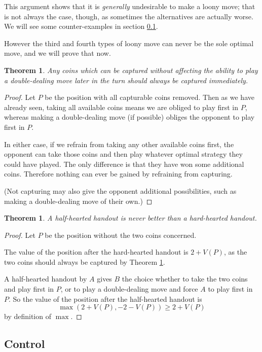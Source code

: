 \documentclass[a4paper,twocolumn]{article}
\newtheorem{freecoins}[thm]{Theorem}
\newtheorem{halfheartedbad}[thm]{Theorem}
\begin{document}
This argument shows that it is \emph{generally} undesirable to make a
loony move; that is not always the case, though, as sometimes the
alternatives are actually worse. We will see some counter-examples in
section \ref{smallchains}.

However the third and fourth types of loony move can never be the sole
optimal move, and we will prove that now.

\begin{freecoins}\label{freecoins}
  Any coins which can be captured without affecting the ability to
  play a double-dealing move later in the turn should always be
  captured immediately.
\end{freecoins}
\begin{proof}
  Let $P$ be the position with all capturable coins removed. Then
  as we have already seen, taking all available coins means we are
  obliged to play first in $P$, whereas making a double-dealing move
  (if possible) obliges the opponent to play first in $P$.

  In either case, if we refrain from taking any other available coins
  first, the opponent can take those coins and then play whatever
  optimal strategy they could have played. The only difference is that
  they have won some additional coins. Therefore nothing can ever be
  gained by refraining from capturing.

  (Not capturing may also give the opponent additional possibilities,
  such as making a double-dealing move of their own.)
\end{proof}

\begin{halfheartedbad}
  A half-hearted handout is never better than a hard-hearted handout.
\end{halfheartedbad}
\begin{proof}
  Let $P$ be the position without the two coins concerned.

  The value of the position after the hard-hearted handout is
  $2+V(P)$, as the two coins should always be captured by Theorem
  \ref{freecoins}.
  
  A half-hearted handout by $A$ gives $B$ the choice whether to take
  the two coins and play first in $P$, or to play a double-dealing
  move and force $A$ to play first in $P$. So the value of the
  position after the half-hearted handout is $$\max(2+V(P),-2-V(P))
  \ge 2+V(P)$$ by definition of $\max$.
\end{proof}

\subsection{Control}
\label{smallchains}
\end{document}
